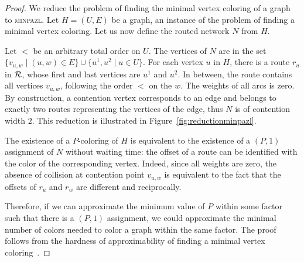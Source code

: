 \documentclass[a4paper,10pt]{journal}
\newcommand\minpazl{\textsc{minpazl}\xspace}
\begin{document}
\begin{proof}
 We reduce the problem of finding the minimal vertex coloring of a graph to \minpazl. Let $H = (U,E)$ be a graph, an instance of the problem of finding a minimal vertex coloring.  Let us now define the routed network $N$ from $H$.
 
 Let $<$ be an arbitrary total order on $U$. 
 The vertices of $N$ are in the set $\{v_{u,w} \mid (u,w) \in E\} \cup \{u^1, u^2 \mid u \in U\}$. 
 For each vertex $u$ in $H$, there is a route $r_u$ in ${\cal R}$, whose first and last vertices
 are $u^1$ and $u^2$. In between, the route contains all vertices $v_{u,w}$, following the order $<$ on the $w$. The weights of all arcs is zero. By construction, a contention vertex corresponds to an edge and belongs to exactly two routes representing the vertices of the edge, thus $N$ is of contention width $2$. This reduction is illustrated in Figure~\ref{fig:reductionminpazl}.

  The existence of a $P$-coloring of $H$ is equivalent to the existence of a $(P,1)$ assignment of $N$ without waiting time: the offset of a route can be identified with the color of the corresponding vertex. Indeed, since all weights are zero, the absence of collision at contention point $v_{u,w}$ is equivalent to the fact that the offsets of $r_u$ and $r_w$ are different and reciprocally.

   Therefore, if we can approximate the minimum value of $P$ within some factor such that there is a $(P,1)$ assignment, we could approximate the minimal number of colors needed to color a graph within the same factor. The proof follows from the hardness of approximability of finding a minimal vertex coloring~\cite{zuckerman2006linear}.
\end{proof}
\end{document}
